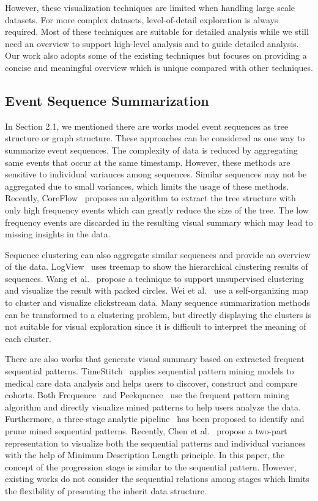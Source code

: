 However, these visualization techniques are limited when handling large scale datasets. For more complex datasets, level-of-detail exploration is always required. Most of these techniques are suitable for detailed analysis while we still need an overview to support high-level analysis and to guide detailed analysis. Our work also adopts some of the existing techniques but focuses on providing a concise and meaningful overview which is unique compared with other techniques.

\subsection{Event Sequence Summarization}

In Section 2.1, we mentioned there are works model event sequences as tree structure or graph structure. These approaches can be considered as one way to summarize event sequences. The complexity of data is reduced by aggregating same events that occur at the same timestamp. However, these methods are sensitive to individual variances among sequences. Similar sequences may not be aggregated due to small variances, which limits the usage of these methods. Recently, CoreFlow~\cite{liu2017coreflow} proposes an algorithm to extract the tree structure with only high frequency events which can greatly reduce the size of the tree. The low frequency events are discarded in the resulting visual summary which may lead to missing insights in the data. 

Sequence clustering can also aggregate similar sequences and provide an overview of the data. LogView~\cite{makanju2008logview} uses treemap to show the hierarchical clustering results of sequences. Wang et al.~\cite{wang2016unsupervised} propose a technique to support unsupervised clustering and visualize the result with packed circles. Wei et al.~\cite{wei2012visual} use a self-organizing map to cluster and visualize clickstream data. Many sequence summarization methods can be transformed to a clustering problem, but directly displaying the clusters is not suitable for visual exploration since it is difficult to interpret the meaning of each cluster.

There are also works that generate visual summary based on extracted frequent sequential patterns. TimeStitch~\cite{polack2015timestitch} applies sequential pattern mining models to medical care data analysis and helps users to discover, construct and compare cohorts. Both Frequence~\cite{perer2014frequence} and Peekquence~\cite{kwon2016peekquence} use the frequent pattern mining algorithm and directly visualize mined patterns to help users analyze the data. Furthermore, a three-stage analytic pipeline~\cite{liu2017patterns} has been proposed to identify and prune mined sequential patterns. Recently, Chen et al.~\cite{chen2018sequence} propose a two-part representation to visualize both the sequential patterns and individual variances with the help of Minimum Description Length principle. In this paper, the concept of the progression stage is similar to the sequential pattern. However, existing works do not consider the sequential relations among stages which limits the flexibility of presenting the inherit data structure. 

